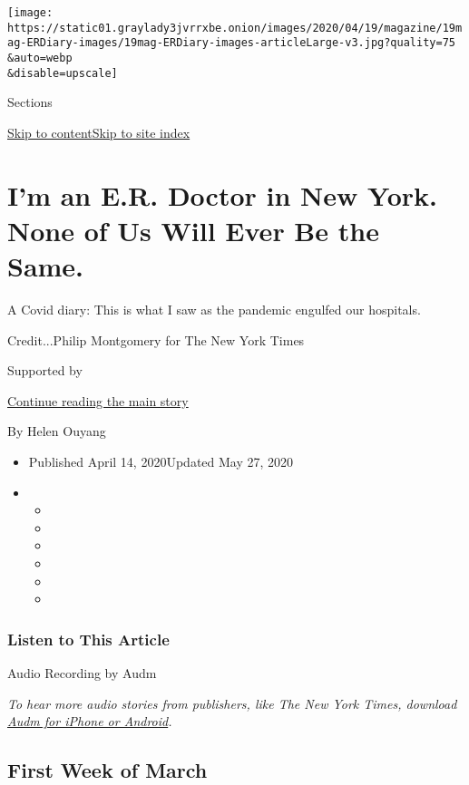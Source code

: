 \texttt{[image: https://static01.graylady3jvrrxbe.onion/images/2020/04/19/magazine/19mag-ERDiary-images/19mag-ERDiary-images-articleLarge-v3.jpg?quality=75\\\&auto=webp\\\&disable=upscale]}

Sections

\protect\hyperlink{site-content}{Skip to
content}\protect\hyperlink{site-index}{Skip to site index}

\hypertarget{im-an-er-doctor-in-new-york-none-of-us-will-ever-be-the-same}{%
\section{I'm an E.R. Doctor in New York. None of Us Will Ever Be the
Same.}\label{im-an-er-doctor-in-new-york-none-of-us-will-ever-be-the-same}}

A Covid diary: This is what I saw as the pandemic engulfed our
hospitals.

Credit...Philip Montgomery for The New York Times

Supported by

\protect\hyperlink{after-sponsor}{Continue reading the main story}

By Helen Ouyang

\begin{itemize}
\item
  Published April 14, 2020Updated May 27, 2020
\item
  \begin{itemize}
  \item
  \item
  \item
  \item
  \item
  \item
  \end{itemize}
\end{itemize}

\hypertarget{listen-to-this-article}{%
\subsubsection{Listen to This Article}\label{listen-to-this-article}}

Audio Recording by Audm

\emph{To hear more audio stories from publishers, like The New York
Times, download}
\href{https://www.audm.com/?utm_source=nyt\&utm_medium=embed\&utm_campaign=state_of_emergency}{\emph{Audm
for iPhone or Android}}\emph{.}

\hypertarget{first-week-of-march}{%
\subsection{First Week of March}\label{first-week-of-march}}

